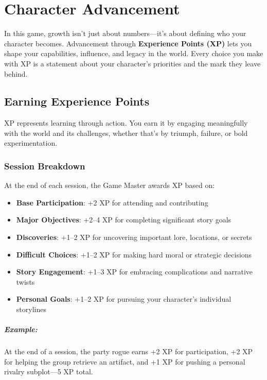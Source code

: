 \chapter{Character Advancement}
\label{ch:advancement}

In this game, growth isn't just about numbers—it's about defining who your character becomes. Advancement through \textbf{Experience Points (XP)} lets you shape your capabilities, influence, and legacy in the world. Every choice you make with XP is a statement about your character's priorities and the mark they leave behind.

\section{Earning Experience Points}

XP represents learning through action. You earn it by engaging meaningfully with the world and its challenges, whether that's by triumph, failure, or bold experimentation.

\subsection*{Session Breakdown}
At the end of each session, the Game Master awards XP based on:

\begin{itemize}
\item \textbf{Base Participation}: +2 XP for attending and contributing
\item \textbf{Major Objectives}: +2–4 XP for completing significant story goals
\item \textbf{Discoveries}: +1–2 XP for uncovering important lore, locations, or secrets
\item \textbf{Difficult Choices}: +1–2 XP for making hard moral or strategic decisions
\item \textbf{Story Engagement}: +1–3 XP for embracing complications and narrative twists
\item \textbf{Personal Goals}: +1–2 XP for pursuing your character's individual storylines
\end{itemize}

\paragraph{Example:}  
At the end of a session, the party rogue earns +2 XP for participation, +2 XP for helping the group retrieve an artifact, and +1 XP for pushing a personal rivalry subplot—5 XP total.

